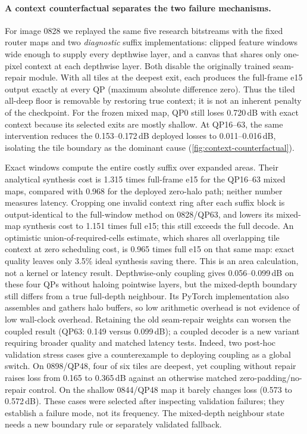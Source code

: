 \paragraph{A context counterfactual separates the two failure mechanisms.}
For image 0828 we replayed the same five research bitstreams with the fixed
router maps and two \emph{diagnostic} suffix implementations: clipped feature
windows wide enough to supply every depthwise layer, and a canvas that shares
only one-pixel context at each depthwise layer. Both disable the originally
trained seam-repair module. With all tiles at the deepest exit, each produces
the full-frame e15 output exactly at every QP (maximum absolute difference
zero). Thus the tiled all-deep floor is removable by restoring true context;
it is not an inherent penalty of the checkpoint. For the frozen mixed map,
QP0 still loses 0.720\,dB with exact context because its selected exits are
mostly shallow. At QP16--63, the same intervention reduces the 0.153--0.172\,dB
deployed losses to 0.011--0.016\,dB, isolating the tile boundary as the
dominant cause (\cref{fig:context-counterfactual}).

Exact windows compute the entire costly suffix over expanded areas. Their
analytical synthesis cost is 1.315 times full-frame e15 for the QP16--63
mixed maps, compared with 0.968 for the deployed zero-halo path; neither
number measures latency. Cropping one invalid context
ring after each suffix block is output-identical to the full-window method
on 0828/QP63, and lowers its mixed-map synthesis cost to 1.151 times full
e15; this still exceeds the full decode. An optimistic union-of-required-cells
estimate, which shares all overlapping tile context at zero scheduling cost,
is 0.965 times full e15 on that same map: exact quality leaves only 3.5\%
ideal synthesis saving there. This is an area calculation, not a kernel or
latency result. Depthwise-only coupling gives
0.056--0.099\,dB on these four QPs without haloing pointwise layers, but
the mixed-depth boundary
still differs from a true full-depth neighbour. Its PyTorch implementation
also assembles and gathers halo buffers, so low arithmetic overhead is not
evidence of low wall-clock overhead. Retaining the old seam-repair weights
can worsen the coupled result (QP63: 0.149 versus 0.099\,dB); a coupled
decoder is a new variant requiring broader quality and matched latency tests.
Indeed, two post-hoc validation stress cases give a counterexample to
deploying coupling as a global switch. On 0898/QP48, four of six tiles are
deepest, yet coupling without repair raises loss from 0.165 to 0.365\,dB
against an otherwise matched zero-padding/no-repair control. On the shallow
0844/QP48 map it barely changes loss (0.573 to 0.572\,dB). These cases were
selected after inspecting validation failures; they establish a failure
mode, not its frequency. The mixed-depth neighbour state needs a new
boundary rule or separately validated fallback.

